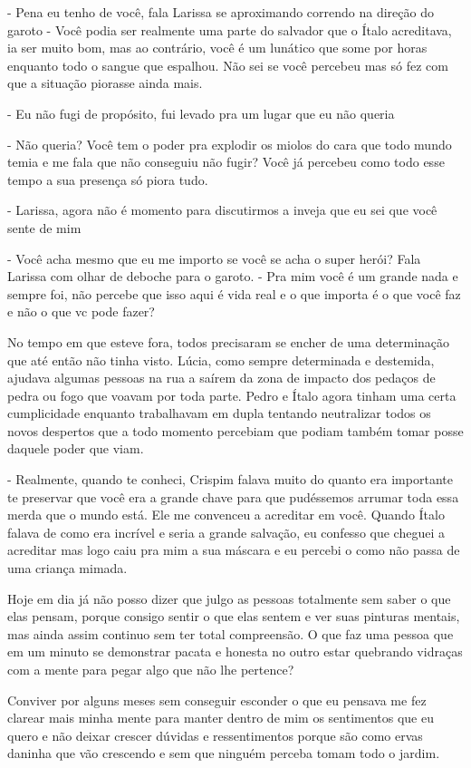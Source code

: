 - Pena eu tenho de você, fala Larissa se aproximando correndo na direção do garoto - Você podia ser realmente uma parte do salvador que o Ítalo acreditava, ia ser muito bom, mas ao contrário, você é um lunático que some por horas enquanto todo o sangue que espalhou. Não sei se você percebeu mas só fez com que a situação piorasse ainda mais.

- Eu não fugi de propósito, fui levado pra um lugar que eu não queria

- Não queria? Você tem o poder pra explodir os miolos do cara que todo mundo temia e me fala que não conseguiu não fugir? Você já percebeu como todo esse tempo a sua presença só piora tudo.

- Larissa, agora não é momento para discutirmos a inveja que eu sei que você sente de mim

- Você acha mesmo que eu me importo se você se acha o super herói? Fala Larissa com olhar de deboche para o garoto. - Pra mim você é um grande nada e sempre foi, não percebe que isso aqui é vida real e o que importa é o que você faz e não o que vc pode fazer?

No tempo em que esteve fora, todos precisaram se encher de uma determinação que até então não tinha visto. Lúcia, como sempre determinada e destemida, ajudava algumas pessoas na rua a saírem da zona de impacto dos pedaços de pedra ou fogo que voavam por toda parte. Pedro e Ítalo agora tinham uma certa cumplicidade enquanto trabalhavam em dupla tentando neutralizar todos os novos despertos que a todo momento percebiam que podiam também tomar posse daquele poder que viam. 

- Realmente, quando te conheci, Crispim falava muito do quanto era importante te preservar que você era a grande chave para que pudéssemos arrumar toda essa merda que o mundo está. Ele me convenceu a acreditar em você. Quando Ítalo falava de como era incrível e seria a grande salvação, eu confesso que cheguei a acreditar mas logo caiu pra mim a sua máscara e eu percebi o como não passa de uma criança mimada.

Hoje em dia já não posso dizer que julgo as pessoas totalmente sem saber o que elas pensam, porque consigo sentir o que elas sentem e ver suas pinturas mentais, mas ainda assim continuo sem ter total compreensão. O que faz uma pessoa que em um minuto se demonstrar pacata e honesta no outro estar quebrando vidraças com a mente para pegar algo que não lhe pertence?

Conviver por alguns meses sem conseguir esconder o que eu pensava me fez clarear mais minha mente para manter dentro de mim os sentimentos que eu quero e não deixar crescer dúvidas e ressentimentos porque são como ervas daninha que vão crescendo e sem que ninguém perceba tomam todo o jardim.

